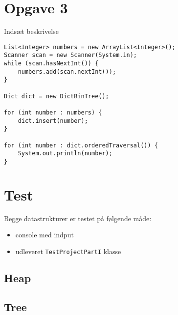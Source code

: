 \documentclass{article}
\begin{document}
\section*{Opgave 3}
Indsæt beskrivelse
\begin{lstlisting}
List<Integer> numbers = new ArrayList<Integer>();
Scanner scan = new Scanner(System.in);
while (scan.hasNextInt()) {
	numbers.add(scan.nextInt());
}

Dict dict = new DictBinTree();

for (int number : numbers) {
	dict.insert(number);
}

for (int number : dict.orderedTraversal()) {
	System.out.println(number);
}
\end{lstlisting}
\newpage
\section*{Test}
Begge datastrukturer er testet på følgende måde:
\begin{itemize}
  \item console med indput
  \item udleveret \texttt{TestProjectPartI} klasse
\end{itemize}
\subsection*{Heap}

\subsection*{Tree}
\end{document}
